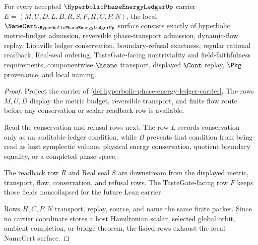 \begin{theorem}
\label{thm:hyperbolic-phase-energy-ledger-namecert-obligations}
For every accepted $\HyperbolicPhaseEnergyLedgerUp$ carrier $E=(M,U,D,L,B,R,S,F,H,C,P,N)$, the local $\NameCert_{\HyperbolicPhaseEnergyLedgerUp}$ surface consists exactly of hyperbolic metric-budget admission, reversible phase-transport admission, dynamic-flow replay, Liouville ledger conservation, boundary-refusal exactness, regular rational readback, Real-seal ordering, TasteGate-facing nontriviality and field-faithfulness requirements, componentwise $\hsame$ transport, displayed $\Cont$ replay, $\Pkg$ provenance, and local naming.
\end{theorem}
\begin{proof}
Project the carrier of \autoref{def:hyperbolic-phase-energy-ledger-carrier}. The rows $M,U,D$ display the metric budget, reversible transport, and finite flow route before any conservation or scalar readback row is available.

Read the conservation and refusal rows next. The row $L$ records conservation only as an auditable ledger condition, while $B$ prevents that condition from being read as host symplectic volume, physical energy conservation, quotient boundary equality, or a completed phase space.

The readback row $R$ and Real seal $S$ are downstream from the displayed metric, transport, flow, conservation, and refusal rows. The TasteGate-facing row $F$ keeps those fields noncollapsed for the future Lean carrier.

Rows $H,C,P,N$ transport, replay, source, and name the same finite packet. Since no carrier coordinate stores a host Hamiltonian scalar, selected global orbit, ambient completion, or bridge theorem, the listed rows exhaust the local NameCert surface.
\end{proof}

